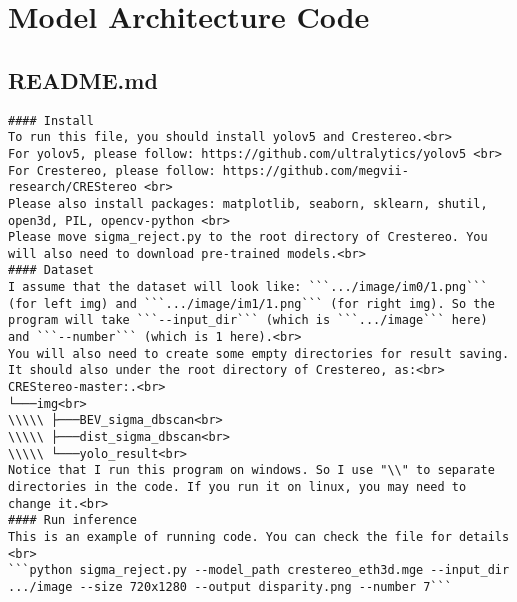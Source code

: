 \footnotesize
\section*{Model Architecture Code}
\subsection*{README.md}
\begin{lstlisting}
#### Install
To run this file, you should install yolov5 and Crestereo.<br>
For yolov5, please follow: https://github.com/ultralytics/yolov5 <br>
For Crestereo, please follow: https://github.com/megvii-research/CREStereo <br>
Please also install packages: matplotlib, seaborn, sklearn, shutil, open3d, PIL, opencv-python <br>
Please move sigma_reject.py to the root directory of Crestereo. You will also need to download pre-trained models.<br>
#### Dataset
I assume that the dataset will look like: ```.../image/im0/1.png``` (for left img) and ```.../image/im1/1.png``` (for right img). So the program will take ```--input_dir``` (which is ```.../image``` here) and ```--number``` (which is 1 here).<br>
You will also need to create some empty directories for result saving. It should also under the root directory of Crestereo, as:<br>
CREStereo-master:.<br>
└───img<br>
\\\\\ ├───BEV_sigma_dbscan<br>
\\\\\ ├───dist_sigma_dbscan<br>
\\\\\ └───yolo_result<br>
Notice that I run this program on windows. So I use "\\" to separate directories in the code. If you run it on linux, you may need to change it.<br>
#### Run inference
This is an example of running code. You can check the file for details <br>
```python sigma_reject.py --model_path crestereo_eth3d.mge --input_dir .../image --size 720x1280 --output disparity.png --number 7```
\end{lstlisting}
